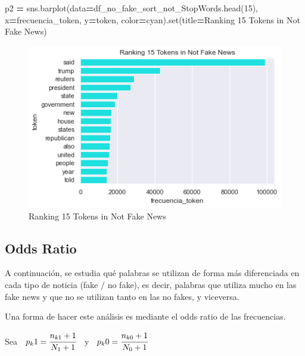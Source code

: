\documentclass[
  11pt,
  a4paper,
]{article}
\newenvironment{Shaded}{\begin{snugshade}}{\end{snugshade}}
\newcommand{\BuiltInTok}[1]{#1}
\newcommand{\DecValTok}[1]{\textcolor[rgb]{0.00,0.00,0.81}{#1}}
\newcommand{\NormalTok}[1]{#1}
\newcommand{\OperatorTok}[1]{\textcolor[rgb]{0.81,0.36,0.00}{\textbf{#1}}}
\newcommand{\StringTok}[1]{\textcolor[rgb]{0.31,0.60,0.02}{#1}}
\begin{document}
\begin{Shaded}
\begin{Highlighting}[]
\NormalTok{p2 }\OperatorTok{=}\NormalTok{ sns.barplot(data}\OperatorTok{=}\NormalTok{df\_no\_fake\_sort\_not\_StopWords.head(}\DecValTok{15}\NormalTok{), x}\OperatorTok{=}\StringTok{\textquotesingle{}frecuencia\_token\textquotesingle{}}\NormalTok{, y}\OperatorTok{=}\StringTok{\textquotesingle{}token\textquotesingle{}}\NormalTok{, color}\OperatorTok{=}\StringTok{\textquotesingle{}cyan\textquotesingle{}}\NormalTok{).}\BuiltInTok{set}\NormalTok{(title}\OperatorTok{=}\StringTok{\textquotesingle{}Ranking 15 Tokens in Not Fake News\textquotesingle{}}\NormalTok{) }
\end{Highlighting}
\end{Shaded}

\begin{figure}
\centering
\includegraphics{output_64_0.png}
\caption{Ranking 15 Tokens in Not Fake News}
\end{figure}

\hypertarget{odds-ratio}{%
\subsection{Odds Ratio}\label{odds-ratio}}

A continuación, se estudia qué palabras se utilizan de forma más
diferenciada en cada tipo de noticia (fake / no fake), es decir,
palabras que utiliza mucho en las fake news y que no se utilizan tanto
en las no fakes, y viceversa.

Una forma de hacer este análisis es mediante el odds ratio de las
frecuencias.

Sea \(\hspace{0.2cm}p_k1 = \cfrac{n_{k1} + 1}{N_1 + 1}\hspace{0.2cm}\) y
\(\hspace{0.2cm}p_k0 = \cfrac{n_{k0} + 1}{N_0 +1}\)
\end{document}
